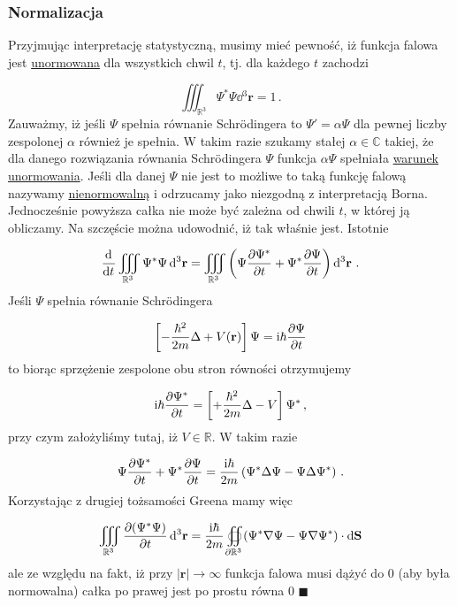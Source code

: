 \documentclass{myclass}
\begin{document}
\subsubsection{Normalizacja}

Przyjmując interpretację statystyczną, musimy mieć pewność, iż funkcja falowa jest
\underline{unormowana} dla wszystkich chwil \(t\), tj. dla każdego \(t\) zachodzi

\begin{equation*}
    \iiint_{\mathbb{R}^3}\Psi^*\Psi\dd{^3\mathbf{r}}=1\,.
\end{equation*}
Zauważmy, iż jeśli \(\Psi\) spełnia równanie Schr{\"o}dingera to \(\Psi'=\alpha\Psi\) dla pewnej
liczby zespolonej \(\alpha\) również je spełnia. W takim razie szukamy stałej
\(\alpha\in\mathbb{C}\) takiej, że dla danego rozwiązania równania Schr{\"o}dingera \(\Psi\) funkcja
\(\alpha\Psi\) spełniała \underline{warunek unormowania}. Jeśli dla danej \(\Psi\) nie jest to
możliwe to taką funkcję falową nazywamy \underline{nienormowalną} i odrzucamy jako niezgodną z
interpretacją Borna. Jednocześnie powyższa całka nie może być zależna od chwili \(t\), w której ją
obliczamy. Na szczęście można udowodnić, iż tak właśnie jest. Istotnie

\begin{equation*}
    \dv[]{}{t}\iiint_{\mathbb{R}^3}\Psi^*\Psi\dd{^3\mathbf{r}}=\iiint_{\mathbb{R}^3}\left(\Psi\pdv{\Psi^*}{t}+\Psi^*\pdv{\Psi}{t}\right)\dd{^3\mathbf{r}}\,.
\end{equation*}
Jeśli \(\Psi\) spełnia równanie Schr{\"o}dingera

\begin{equation*}
    \left[-\frac{\hbar^2}{2m}\Delta+V(\mathbf{r})\right]\Psi=\mathrm{i}\hbar\pdv{\Psi}{t}
\end{equation*}
to biorąc sprzężenie zespolone obu stron równości otrzymujemy

\begin{equation*}
    \mathrm{i}\hbar\pdv{\Psi^*}{t}=\left[+\frac{\hbar^2}{2m}\Delta -V\right]\Psi^*\,,
\end{equation*}
przy czym założyliśmy tutaj, iż \(\boxed{V\in\mathbb{R}}\). W takim razie

\begin{equation*}
    \Psi\pdv{\Psi^*}{t}+\Psi^*\pdv{\Psi}{t}=\frac{\mathrm{i}\hbar}{2m}\left(\Psi^*\Delta\Psi-\Psi\Delta\Psi^*\right)\,.
\end{equation*}
Korzystając z drugiej tożsamości Greena mamy więc

\begin{equation*}
    \iiint_{\mathbb{R}^3}\pdv{(\Psi^*\Psi)}{t}\dd{^3\mathbf{r}}=\frac{\mathrm{i}\hbar}{2m}\oiint_{\partial\mathbb{R}^3}(\Psi^*\nabla\Psi-\Psi\nabla\Psi^*)\cdot\dd{\mathbf{S}}
\end{equation*}
ale ze względu na fakt, iż przy \(|\mathbf{r}|\to\infty\) funkcja falowa musi dążyć do 0 (aby była
normowalna) całka po prawej jest po prostu równa 0 \(\blacksquare\)
\medskip
\end{document}
